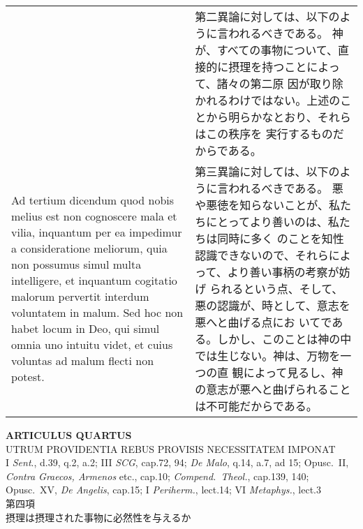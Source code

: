 \documentclass[10pt]{jsarticle} %
\begin{document}
\begin{longtable}{p{21em}p{21em}}
&

第二異論に対しては、以下のように言われるべきである。
神が、すべての事物について、直接的に摂理を持つことによって、諸々の第二原
 因が取り除かれるわけではない。上述のことから明らかなとおり、それらはこの秩序を
 実行するものだからである。


\\


Ad tertium dicendum quod nobis melius est non
cognoscere mala et vilia, inquantum per ea impedimur a consideratione
meliorum, quia non possumus simul multa intelligere, et inquantum
cogitatio malorum pervertit interdum voluntatem in malum. Sed hoc non
habet locum in Deo, qui simul omnia uno intuitu videt, et cuius voluntas
ad malum flecti non potest.

&


第三異論に対しては、以下のように言われるべきである。
悪や悪徳を知らないことが、私たちにとってより善いのは、私たちは同時に多く
 のことを知性認識できないので、それらによって、より善い事柄の考察が妨げ
 られるという点、そして、悪の認識が、時として、意志を悪へと曲げる点にお
 いてである。しかし、このことは神の中では生じない。神は、万物を一つの直
 観によって見るし、神の意志が悪へと曲げられることは不可能だからである。



\end{longtable}
\newpage

\begin{center}
 {\Large {\bf ARTICULUS QUARTUS}}\\
 {\large UTRUM PROVIDENTIA REBUS PROVISIS NECESSITATEM IMPONAT}\\
 {\footnotesize I {\itshape Sent}., d.39, q.2, a.2; III {\itshape SCG},
 cap.72, 94; {\itshape De Malo}, q.14, a.7, ad 15; Opusc.~II, {\itshape
 Contra Graecos, Armenos} etc., cap.10; {\itshape Compend.~Theol.},
 cap.139, 140; Opusc.~XV, {\itshape De Angelis}, cap.15; I {\itshape
 Periherm.}, lect.14; VI {\itshape Metaphys.}, lect.3}\\
 {\Large 第四項\\摂理は摂理された事物に必然性を与えるか}
\end{center}
\end{document}

